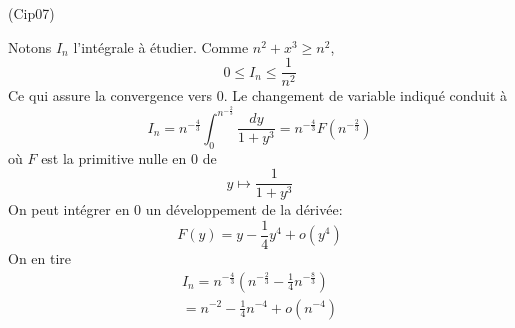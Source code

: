 \begin{tiny}(Cip07)\end{tiny} Notons $I_n$ l'intégrale à étudier.\newline
Comme $n^2+x^3 \geq n^2$,
\begin{displaymath}
  0\leq I_n \leq \frac{1}{n^2}
\end{displaymath}
Ce qui assure la convergence vers $0$.\newline
Le changement de variable indiqué conduit à
\begin{displaymath}
I_n = n^{-\frac{4}{3}}\int_0^{n^{-\frac{2}{3}}}\frac{dy}{1+y^3} = n^{-\frac{4}{3}} F(n^{-\frac{2}{3}})
\end{displaymath}
où $F$ est la primitive nulle en $0$ de
\begin{displaymath}
  y \mapsto \frac{1}{1+y^3}
\end{displaymath}
On peut intégrer en $0$ un développement de la dérivée: 
\begin{displaymath}
  F(y) = y - \frac{1}{4}y^{4} + o(y^4)
\end{displaymath}
On en tire
\begin{multline*}
I_n = n^{-\frac{4}{3}}\left( n^{-\frac{2}{3}} -\frac{1}{4}n^{-\frac{8}{3}}\right) \\
= n^{-2} - \frac{1}{4}n^{-4} + o(n^{-4})
\end{multline*}
